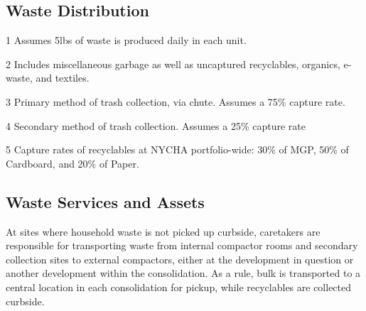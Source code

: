 \textcolor{ccorange}{\section{Waste Distribution}}


\begin{table}[H]
\begin{threeparttable}
\small



\begin{tablenotes}
\item [1] Assumes 5lbs of waste is produced daily in each unit.
\item [2] Includes miscellaneous garbage as well as uncaptured recyclables, organics, e-waste, and textiles.
\item [3] Primary method of trash collection, via chute. Assumes a 75\% capture rate.
\item [4] Secondary method of trash collection. Assumes a 25\% capture rate
\item [5] Capture rates of recyclables at NYCHA portfolio-wide: 30\% of MGP, 50\% of Cardboard, and 20\% of Paper. 
\end{tablenotes}
\end{threeparttable}
\end{table}

\pagebreak

\textcolor{ccorange}{\section{Waste Services and Assets}}
At sites where household waste is not picked up curbside, caretakers are responsible for transporting waste from internal compactor rooms and secondary collection sites to external compactors, either at the development in question or another development within the consolidation. As a rule, bulk is transported to a central location in each consolidation for pickup, while recyclables are collected curbside.
\begin{table}[H]
\small



\end{table}


